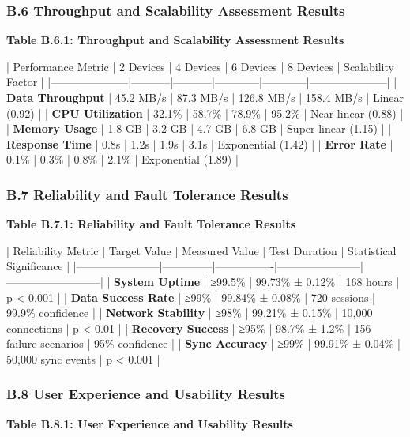 \documentclass[12pt,a4paper]{article}
\begin{document}
\subsubsection{B.6 Throughput and Scalability Assessment Results}

\textbf{Table B.6.1: Throughput and Scalability Assessment Results}

| Performance Metric  | 2 Devices | 4 Devices | 6 Devices  | 8 Devices  | Scalability Factor  |
|---------------------|-----------|-----------|------------|------------|---------------------|
| \textbf{Data Throughput} | 45.2 MB/s | 87.3 MB/s | 126.8 MB/s | 158.4 MB/s | Linear (0.92)       |
| \textbf{CPU Utilization} | 32.1\%     | 58.7\%     | 78.9\%      | 95.2\%      | Near-linear (0.88)  |
| \textbf{Memory Usage}    | 1.8 GB    | 3.2 GB    | 4.7 GB     | 6.8 GB     | Super-linear (1.15) |
| \textbf{Response Time}   | 0.8s      | 1.2s      | 1.9s       | 3.1s       | Exponential (1.42)  |
| \textbf{Error Rate}      | 0.1\%      | 0.3\%      | 0.8\%       | 2.1\%       | Exponential (1.89)  |

\subsubsection{B.7 Reliability and Fault Tolerance Results}

\textbf{Table B.7.1: Reliability and Fault Tolerance Results}

| Reliability Metric    | Target Value | Measured Value | Test Duration         | Statistical Significance |
|-----------------------|--------------|----------------|-----------------------|--------------------------|
| \textbf{System Uptime}     | ≥99.5\%       | 99.73\% ± 0.12\% | 168 hours             | p < 0.001                |
| \textbf{Data Success Rate} | ≥99\%         | 99.84\% ± 0.08\% | 720 sessions          | 99.9\% confidence         |
| \textbf{Network Stability} | ≥98\%         | 99.21\% ± 0.15\% | 10,000 connections    | p < 0.01                 |
| \textbf{Recovery Success}  | ≥95\%         | 98.7\% ± 1.2\%   | 156 failure scenarios | 95\% confidence           |
| \textbf{Sync Accuracy}     | ≥99\%         | 99.91\% ± 0.04\% | 50,000 sync events    | p < 0.001                |

\subsubsection{B.8 User Experience and Usability Results}

\textbf{Table B.8.1: User Experience and Usability Results}
\end{document}
